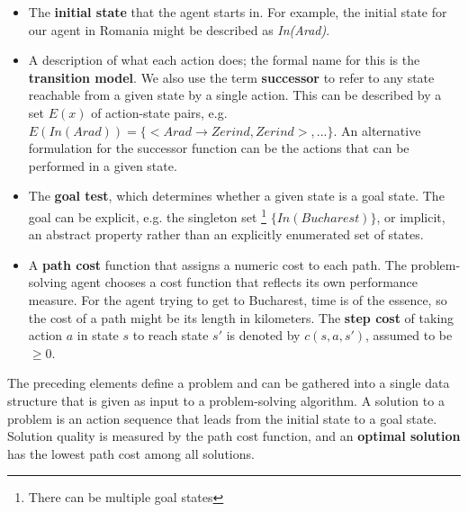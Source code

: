 \begin{itemize}
    \item The \textbf{initial state} that the agent starts in. For example, the initial state for our agent in Romania might be described as \textit{In(Arad)}.

    \item A description of what each action does; the formal name for this is the \textbf{transition model}. We also use the term \textbf{successor} to refer to any state reachable from a given state by a single action. This can be described by a set $E(x)$ of action-state pairs, e.g. $E(In(Arad)) = \{<Arad \rightarrow Zerind, Zerind>, ...\}$. An alternative formulation for the successor function can be the actions that can be performed in a given state.

    \item The \textbf{goal test}, which determines whether a given state is a goal state. The goal can be explicit, e.g. the singleton set \footnote{There can be multiple goal states} $\{In(Bucharest)\}$, or implicit, an abstract property rather than an explicitly enumerated set of states.

    \item A \textbf{path cost} function that assigns a numeric cost to each path. The problem-solving agent chooses a cost function that reflects its own performance measure. For the agent trying to get to Bucharest, time is of the essence, so the cost of a path might be its length in kilometers. The \textbf{step cost} of taking action $a$ in state $s$ to reach state $s'$ is denoted by $c(s, a, s')$, assumed to be $\geq 0$.
\end{itemize}
The preceding elements define a problem and can be gathered into a single data structure that is given as input to a problem-solving algorithm. A solution to a problem is an action sequence that leads from the initial state to a goal state. Solution quality is measured by the path cost function, and an \textbf{optimal solution} has the lowest path cost among all solutions.

